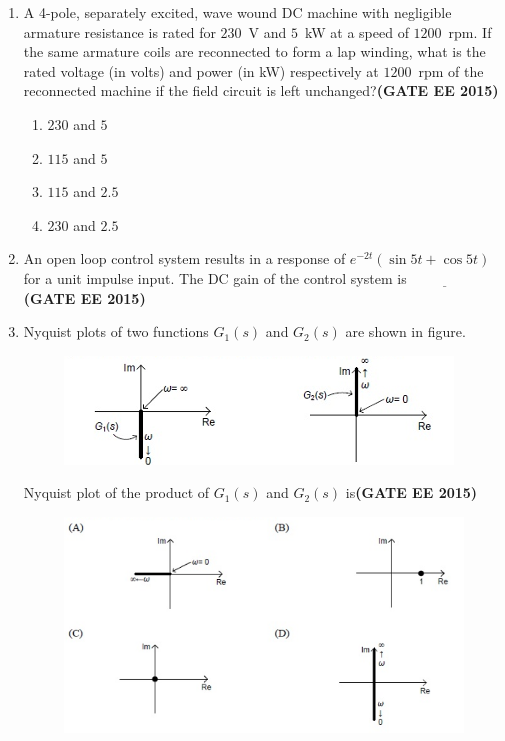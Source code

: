 \documentclass[a4paper,12pt]{exam}
\theoremstyle{remark}
\begin{document}
\begin{enumerate}
\item A 4-pole, separately excited, wave wound DC machine with negligible armature resistance is rated for $230$~V and $5$~kW at a speed of $1200$~rpm. If the same armature coils are reconnected to form a lap winding, what is the rated voltage (in volts) and power (in kW) respectively at $1200$~rpm of the reconnected machine if the field circuit is left unchanged?\hfill{\textbf{(GATE EE 2015)}}

\begin{multicols}{4}
\begin{enumerate}
    \item $230$ and $5$
    \item $115$ and $5$
    \item $115$ and $2.5$
    \item $230$ and $2.5$
\end{enumerate}
\end{multicols}

\item An open loop control system results in a response of $e^{-2t}(\sin 5t + \cos 5t)$ for a unit impulse input. The DC gain of the control system is $\underline{\hspace{2cm}}$\hfill{\textbf{(GATE EE 2015)}}
\item Nyquist plots of two functions $G_1(s)$ and $G_2(s)$ are shown in figure.
\begin{figure}[H]
    \centering
    \includegraphics[width=0.5\columnwidth]{figs/2Q 35.png}
    \caption{}
    \label{fig:placeholder}
\end{figure}


Nyquist plot of the product of $G_1(s)$ and $G_2(s)$ is\hfill{\textbf{(GATE EE 2015)}}
\begin{figure}
    \centering
    \includegraphics[width=0.9\columnwidth]{figs/2Q 35 opt.png}
\end{figure}


\end{enumerate}
\end{document}
